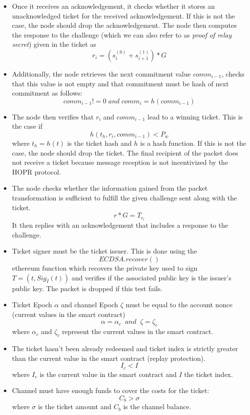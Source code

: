 \begin{itemize}
    \item Once it receives an acknowledgement, it checks whether it stores an unacknowledged ticket for the received acknowledgement.
If this is not the case, the node should drop the acknowledgement.
\newline The node then computes the response to the challenge (which we can also refer to as \textit{proof of relay secret}) given in the ticket as $$r_i=(s_i^{(0)}+s_{i+1}^{(1)})*G$$
\item Additionally, the node retrieves the next commitment value $comm_{i-1}$, checks that this value is not empty and that commitment must be hash of next commitment as follows:
$$ comm_{i-1} != 0 \; and \; comm_{i}=h(comm_{i-1})$$
\item The node then verifies that $r_i$ and $comm_{i-1}$ lead to a winning ticket.
This is the case if $$h(t_h, r_i, comm_{i-1} ) <P_w$$ where $t_h=h(t)$ is the ticket hash and $h$ is a hash function.
If this is not the case, the node should drop the ticket.
The final recipient of the packet does not receive a ticket because message reception is not incentivized by the HOPR protocol.
\item  The node checks whether the information gained from the packet transformation is sufficient to fulfill the given challenge sent along with the ticket. $$r*G=T_{c_i}$$
It then replies with an acknowledgement that includes a response to the challenge.
\item Ticket signer must be the ticket issuer. This is done using the $$ECDSA.recover()$$ ethereum function which recovers the private key used to sign $T= (t, Sig_I(t))$ and verifies if the associated public key is the issuer's public key. The packet is dropped if this test fails.
\item Ticket Epoch $\alpha$ and channel Epoch $\zeta$ must be equal to the account nonce (current values in the smart contract) $$\alpha=\alpha_c \;\; and \;\; \zeta=\zeta_c$$
where $\alpha_c$ and $\zeta_c$ represent the current values in the smart contract.
\item The ticket hasn't been already redeemed and ticket index is strictly greater than the current value in the smart contract (replay protection).
     $$I_c <I$$ where $I_c$ is the current value in the smart contract and $I$ the ticket index.
\item Channel must have enough funds to cover the costs for the ticket: $$ C_b>\sigma$$ where $\sigma$ is the ticket amount and $C_b$ is the channel balance.
   


\end{itemize}








